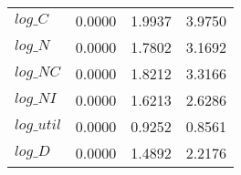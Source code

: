 \begin{center}
\begin{longtable}{lccc}
$log\_C     $	 & 	       0.0000	 & 	       1.9937	 & 	       3.9750 \\ 
$log\_N     $	 & 	       0.0000	 & 	       1.7802	 & 	       3.1692 \\ 
$log\_NC    $	 & 	       0.0000	 & 	       1.8212	 & 	       3.3166 \\ 
$log\_NI    $	 & 	       0.0000	 & 	       1.6213	 & 	       2.6286 \\ 
$log\_util  $	 & 	       0.0000	 & 	       0.9252	 & 	       0.8561 \\ 
$log\_D     $	 & 	       0.0000	 & 	       1.4892	 & 	       2.2176 \\ 
\end{longtable}
 \end{center}
